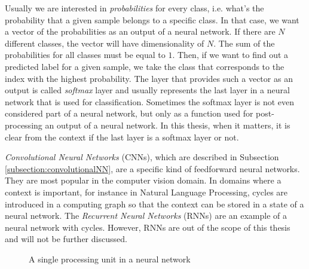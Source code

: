 Usually we are interested in \textit{probabilities} for every class, i.e. what's the probability that a given sample belongs to a specific class. In that case, we want a vector of the probabilities as an output of a neural network. If there are $N$ different classes, the vector will have dimensionality of $N$. The sum of the probabilities for all classes must be equal to $1$. Then, if we want to find out a predicted label for a given sample, we take the class that corresponds to the index with the highest probability. The layer that provides such a vector as an output is called \textit{softmax} layer and usually represents the last layer in a neural network that is used for classification. Sometimes the softmax layer is not even considered part of a neural network, but only as a function used for post-processing an output of a neural network. In this thesis, when it matters, it is clear from the context if the last layer is a softmax layer or not.

 \textit{Convolutional Neural Networks} (CNNs), which are described in Subsection \ref{subsection:convolutionalNN}, are a specific kind of feedforward neural networks. They are most popular in the computer vision domain. In domains where a context is important, for instance in Natural Language Processing, cycles are introduced in a computing graph so that the context can be stored in a state of a neural network.  The \textit{Recurrent Neural Networks} (RNNs) are an example of a neural network with cycles. However, RNNs are out of the scope of this thesis and will not be further discussed.

\begin{figure}
\caption{A single processing unit in a neural network}
\label{fig:basic-neuron}
\end{figure}